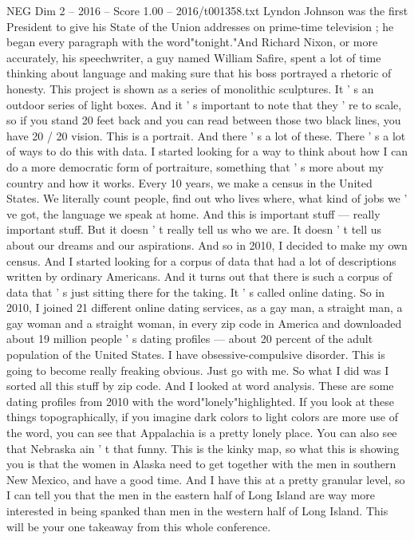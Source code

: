 \begin{textsample}{NEG Dim 2 – 2016 – Score 1.00 – 2016/t001358.txt}
Lyndon Johnson was the first President to give his State of the Union addresses on prime-time television ; he began every paragraph with the word"tonight."And Richard Nixon, or more accurately, his speechwriter, a guy named William Safire, spent a lot of time thinking about language and making sure that his boss portrayed a rhetoric of honesty.
This project is shown as a series of monolithic sculptures.
It ' s an outdoor series of light boxes.
And it ' s important to note that they ' re to scale, so if you stand 20 feet back and you can read between those two black lines, you have 20 / 20 vision.
This is a portrait.
And there ' s a lot of these.
There ' s a lot of ways to do this with data.
I started looking for a way to think about how I can do a more democratic form of portraiture, something that ' s more about my country and how it works.
Every 10 years, we make a census in the United States.
We literally count people, find out who lives where, what kind of jobs we ' ve got, the language we speak at home.
And this is important stuff — really important stuff.
But it doesn ' t really tell us who we are.
It doesn ' t tell us about our dreams and our aspirations.
And so in 2010, I decided to make my own census.
And I started looking for a corpus of data that had a lot of descriptions written by ordinary Americans.
And it turns out that there is such a corpus of data that ' s just sitting there for the taking.
It ' s called online dating.
So in 2010, I joined 21 different online dating services, as a gay man, a straight man, a gay woman and a straight woman, in every zip code in America and downloaded about 19 million people ' s dating profiles — about 20 percent of the adult population of the United States.
I have obsessive-compulsive disorder.
This is going to become really freaking obvious.
Just go with me.
So what I did was I sorted all this stuff by zip code.
And I looked at word analysis.
These are some dating profiles from 2010 with the word"lonely"highlighted.
If you look at these things topographically, if you imagine dark colors to light colors are more use of the word, you can see that Appalachia is a pretty lonely place.
You can also see that Nebraska ain ' t that funny.
This is the kinky map, so what this is showing you is that the women in Alaska need to get together with the men in southern New Mexico, and have a good time.
And I have this at a pretty granular level, so I can tell you that the men in the eastern half of Long Island are way more interested in being spanked than men in the western half of Long Island.
This will be your one takeaway from this whole conference.

\end{textsample}
